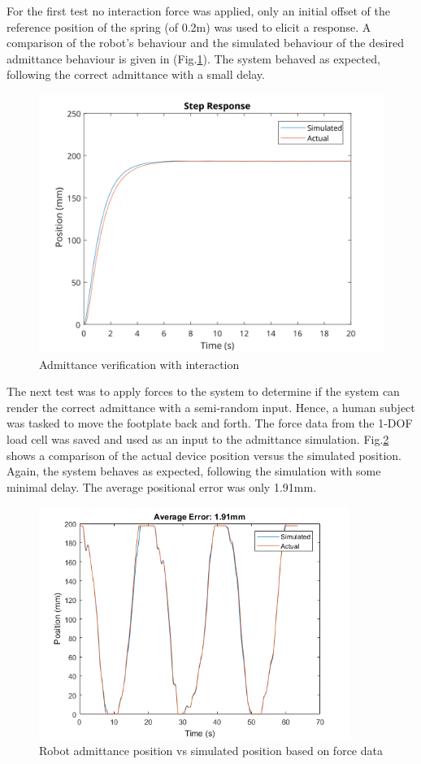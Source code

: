 \documentclass[12pt]{report}
\begin{document}
For the first test no interaction force was applied, only an initial offset of the reference position of the spring (of 0.2m) was used to elicit a response. A comparison of the robot's behaviour and the simulated behaviour of the desired admittance behaviour is given in (Fig.\ref{fig:nVerNoInt}). The system behaved as expected, following the correct admittance with a small delay.

\begin{figure}[t] 
	\centering
	\includegraphics[width=0.9\linewidth]{Mar12_NoForce_Step_Plot}
	\caption{Admittance verification with interaction}
	\label{fig:nVerNoInt}
\end{figure}

The next test was to apply forces to the system to determine if the system can render the correct admittance with a semi-random input. Hence, a human subject was tasked to move the footplate back and forth. The force data from the 1-DOF load cell was saved and used as an input to the admittance simulation. Fig.\ref{fig:adm_sim} shows a comparison of the actual device position versus the simulated position. Again, the system behaves as expected, following the simulation with some minimal delay. The average positional error was only 1.91mm. 

\begin{figure}[h]
	\centering
	\includegraphics[width=0.9\textwidth]{admittance_sim}
	\caption{Robot admittance position vs simulated position based on force data}
	\label{fig:adm_sim}
\end{figure}	
\end{document}
